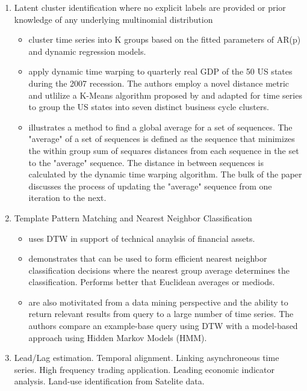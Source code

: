 \documentclass[12pt]{article}
\begin{document}
\begin{enumerate}
    \item Latent cluster identification where no explicit labels are provided or prior knowledge of any underlying multinomial distribution
    \begin{itemize}
        \item \parencite{FruhwirthKaufmann2004} cluster time series into K groups based on the fitted parameters of AR(p) and dynamic regression models.
        \item \parencite{FrancesWiemann2020} apply dynamic time warping to quarterly real GDP of the 50 US states during the 2007 recession. The authors employ a novel distance metric and utlilize a K-Means algorithm proposed by \cite{PETITJEAN2011678} and adapted for time series to group the US states into seven distinct business cycle clusters.
        \item \cite{PETITJEAN2011678} illustrates a method to find a global average for a set of sequences. The "average" of a set of sequences is defined as the sequence that minimizes the within group sum of sequares distances from each sequence in the set to the "average" sequence. The distance in between sequences is calculated by the dynamic time warping algorithm. The bulk of the paper discusses the process of updating the "average" sequence from one iteration to the next. 
    \end{itemize}
    \item Template Pattern Matching and Nearest Neighbor Classification
    \begin{itemize}
        \item \cite{WAN2017151} uses DTW in support of technical anaylsis of financial assets.
        \item \cite{Petitjean_et_al_2016} demonstrates that \cite{PETITJEAN2011678} can be used to form efficient nearest neighbor classification decisions where the nearest group average determines the classification. Performs better that Euclidean averages or mediods.
        \item \parencite{KotsifakosAthitsosPapapetrou_2011} are also motivitated from a data mining perspective and the ability to return relevant results from query to a large number of time series. The authors compare an example-base query using DTW with a model-based approach using Hidden Markov Models (HMM).
    \end{itemize}
    \item Lead/Lag estimation. Temporal alignment. Linking asynchroneous time series. High frequency trading application. Leading economic indicator analysis. Land-use identification from Satelite data.

\end{enumerate}
\end{document}
